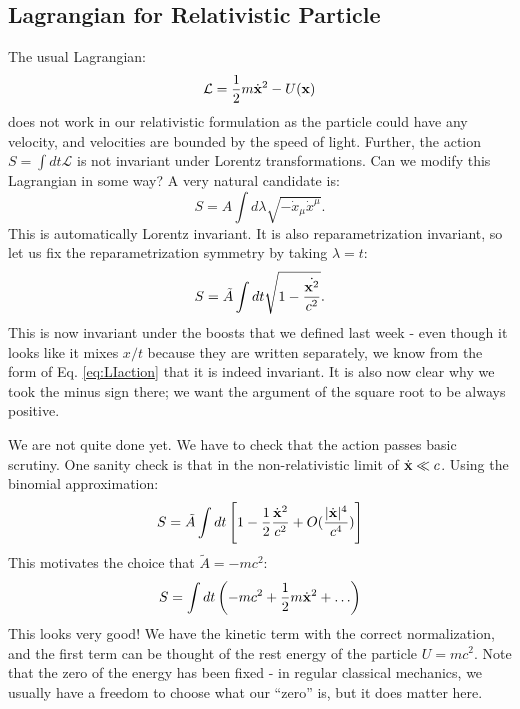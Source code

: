 \subsection{Lagrangian for Relativistic Particle}
The usual Lagrangian:
\begin{equation}
    \mathcal{L} = \frac{1}{2}m\dot{\mathbf{x}}^2 - U(\mathbf{x})
\end{equation}
does not work in our relativistic formulation as the particle could have any velocity, and velocities are bounded by the speed of light. Further, the action $S = \int dt \mathcal{L}$ is not invariant under Lorentz transformations. Can we modify this Lagrangian in some way? A very natural candidate is:
\begin{equation}\label{eq:LIaction}
    S = A\int d\lambda \sqrt{-\dot{x}_\mu \dot{x}^\mu}.
\end{equation}
This is automatically Lorentz invariant. It is also reparametrization invariant, so let us fix the reparametrization symmetry by taking $\lambda = t$:
\begin{equation}
    S = \tilde{A}\int dt \sqrt{1 - \frac{\dot{\mathbf{x}^2}}{c^2}}.
\end{equation}
This is now invariant under the boosts that we defined last week - even though it looks like it mixes $x/t$ because they are written separately, we know from the form of Eq. \eqref{eq:LIaction} that it is indeed invariant. It is also now clear why we took the minus sign there; we want the argument of the square root to be always positive.

We are not quite done yet. We have to check that the action passes basic scrutiny. One sanity check is that in the non-relativistic limit of $\dot{\mathbf{x}} \ll c$. Using the binomial approximation:
\begin{equation}
    S = \tilde{A}\int dt\left[1 - \frac{1}{2}\frac{\dot{\mathbf{x}}^2}{c^2} + O(\frac{\lvert \dot{\mathbf{x}} \rvert^4}{c^4})\right]
\end{equation}
This motivates the choice that $\tilde{A} = -mc^2$:
\begin{equation}
    S = \int dt\left(-mc^2 + \frac{1}{2}m\dot{\mathbf{x}}^2 + \ldots \right)
\end{equation}
This looks very good! We have the kinetic term with the correct normalization, and the first term can be thought of the rest energy of the particle $U = mc^2$. Note that the zero of the energy has been fixed - in regular classical mechanics, we usually have a freedom to choose what our ``zero'' is, but it does matter here.

